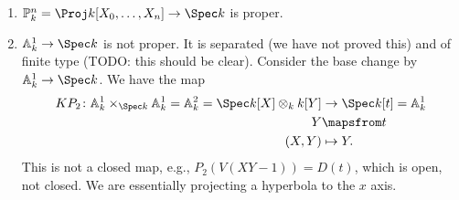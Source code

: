 \begin{enumerate}[label=(\arabic*)]
	\item  $\mathbb{P}_k^n = \Proj k[X_0, \ldots, X_n] \to \Spec k$ is proper.
	\item $\mathbb{A}_k^1\to \Spec k$ is not proper. It is separated (we have not proved
		this) and of finite type (TODO: this should be clear). Consider the base
		change by $\mathbb{A}_k^1\to \Spec k$. We have the map
		\begin{align*}
		KP_2\colon	\mathbb{A}_k^1\times_{\Spec k} \mathbb{A}_k^1 = \mathbb{A}_k^2 = \Spec k[X] \otimes_k k[Y] &\to \Spec k[t]= \mathbb{A}_k^1\\
			Y &\mapsfrom t\\
			(X, Y)&\mapsto Y.
		\end{align*}
		This is not a closed map, e.g., $P_2(V(XY-1)) = D(t)$, which is open,
		not closed. We are essentially projecting a hyperbola to the $x$ axis.
\end{enumerate}
